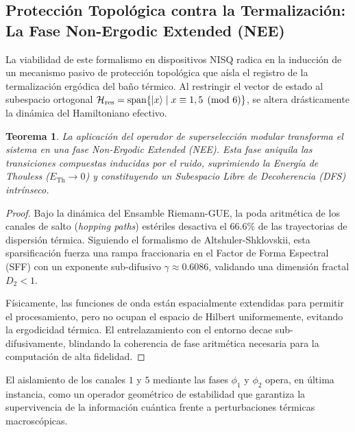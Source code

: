 \documentclass[12pt,a4paper]{article}
\theoremstyle{plain}
\newtheorem{teorema}{Teorema}[section]
\theoremstyle{definition}
\theoremstyle{remark}
\begin{document}
\subsection{Protección Topológica contra la Termalización: La Fase Non-Ergodic Extended (NEE)}
\label{subsec:decoherencia_nee}

La viabilidad de este formalismo en dispositivos NISQ radica en la inducción de un mecanismo pasivo de protección topológica que aísla el registro de la termalización ergódica del baño térmico. Al restringir el vector de estado al subespacio ortogonal $\mathcal{H}_{\text{res}} = \text{span}\{\ket{x} \mid x \equiv 1, 5 \pmod 6\}$, se altera drásticamente la dinámica del Hamiltoniano efectivo.

\begin{teorema}
La aplicación del operador de superselección modular transforma el sistema en una fase \textit{Non-Ergodic Extended} (NEE). Esta fase aniquila las transiciones compuestas inducidas por el ruido, suprimiendo la Energía de Thouless ($E_{\text{Th}} \to 0$) y constituyendo un Subespacio Libre de Decoherencia (DFS) intrínseco.
\end{teorema}

\begin{proof}
Bajo la dinámica del Ensamble Riemann-GUE, la poda aritmética de los canales de salto (\textit{hopping paths}) estériles desactiva el $66.6\%$ de las trayectorias de dispersión térmica. Siguiendo el formalismo de Altshuler-Shklovskii, esta sparsificación fuerza una rampa fraccionaria en el Factor de Forma Espectral (SFF) con un exponente sub-difusivo $\gamma \approx 0.6086$, validando una dimensión fractal $D_2 < 1$. 

Físicamente, las funciones de onda están espacialmente extendidas para permitir el procesamiento, pero no ocupan el espacio de Hilbert uniformemente, evitando la ergodicidad térmica. El entrelazamiento con el entorno decae sub-difusivamente, blindando la coherencia de fase aritmética necesaria para la computación de alta fidelidad.
\end{proof}

El aislamiento de los canales $1$ y $5$ mediante las fases $\phi_1$ y $\phi_2$ opera, en última instancia, como un operador geométrico de estabilidad que garantiza la supervivencia de la información cuántica frente a perturbaciones térmicas macroscópicas.
\end{document}
